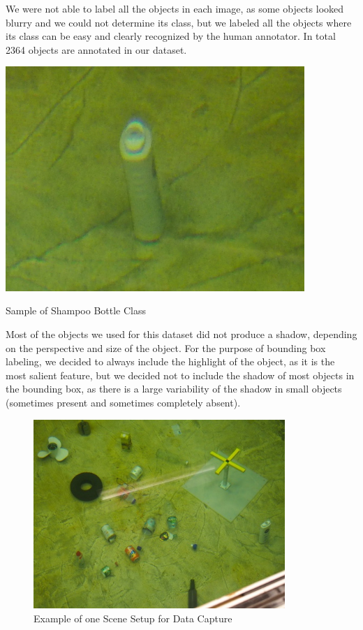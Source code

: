 We were not able to label all the objects in each image, as some objects looked blurry and we could not determine its class, but we labeled all the objects where its class can be easy and clearly recognized by the human annotator. In total 2364 objects are annotated in our dataset.

\begin{marginfigure}
    \centering
    \includegraphics[width = 0.85\textwidth]{chapters/images/dataset/shampoo-bottle.jpg}
    \caption{Sample of Shampoo Bottle Class}
    \label{md:shampoo-bottle}
\end{marginfigure}

Most of the objects we used for this dataset did not produce a shadow, depending on the perspective and size of the object. For the purpose of bounding box labeling, we decided to always include the highlight of the object, as it is the most salient feature, but we decided not to include the shadow of most objects in the bounding box, as there is a large variability of the shadow in small objects (sometimes present and sometimes completely absent).

\begin{figure}[t]
    \centering
    \includegraphics[width = 0.85\textwidth]{chapters/images/dataset/scene-sample.jpg}
    \caption{Example of one Scene Setup for Data Capture}
    \label{md:scene}
\end{figure}

